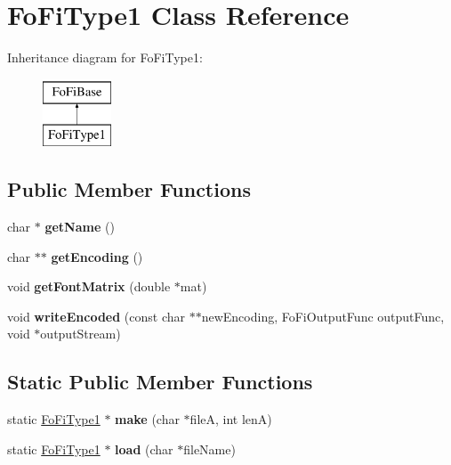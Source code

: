 \hypertarget{class_fo_fi_type1}{}\section{Fo\+Fi\+Type1 Class Reference}
\label{class_fo_fi_type1}
Inheritance diagram for Fo\+Fi\+Type1\+:\begin{figure}[H]
\begin{center}
\leavevmode
\includegraphics[height=2.000000cm]{class_fo_fi_type1}
\end{center}
\end{figure}
\subsection*{Public Member Functions}
\begin{DoxyCompactItemize}
\item 
\mbox{\label{class_fo_fi_type1_abde1c19e66c20380c9bf35df8d74f2e6}} 
char $\ast$ {\bfseries get\+Name} ()
\item 
\mbox{\label{class_fo_fi_type1_a279dd0a347b165163989d6243a04988f}} 
char $\ast$$\ast$ {\bfseries get\+Encoding} ()
\item 
\mbox{\label{class_fo_fi_type1_af2602b36d0378d9c233370d6ded67bd3}} 
void {\bfseries get\+Font\+Matrix} (double $\ast$mat)
\item 
\mbox{\label{class_fo_fi_type1_af50cf7dc0b051a3806a5113ca7eb20c9}} 
void {\bfseries write\+Encoded} (const char $\ast$$\ast$new\+Encoding, Fo\+Fi\+Output\+Func output\+Func, void $\ast$output\+Stream)
\end{DoxyCompactItemize}
\subsection*{Static Public Member Functions}
\begin{DoxyCompactItemize}
\item 
\mbox{\label{class_fo_fi_type1_a46bda2b6de2e90188bfc1a6e596baeac}} 
static \hyperlink{class_fo_fi_type1}{Fo\+Fi\+Type1} $\ast$ {\bfseries make} (char $\ast$fileA, int lenA)
\item 
\mbox{\label{class_fo_fi_type1_a51c2de65e1fcaf5379c15b940a216a05}} 
static \hyperlink{class_fo_fi_type1}{Fo\+Fi\+Type1} $\ast$ {\bfseries load} (char $\ast$file\+Name)
\end{DoxyCompactItemize}
